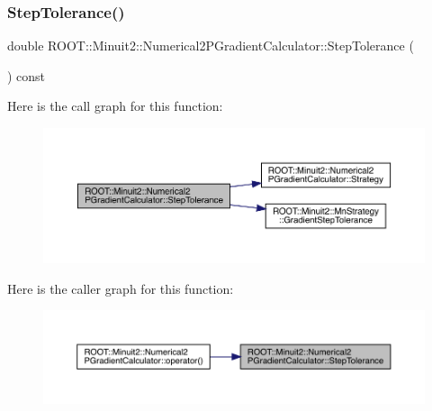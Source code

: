 \subsubsection{\texorpdfstring{StepTolerance()}{StepTolerance()}\hspace{0.1cm}{\footnotesize\ttfamily [1/2]}}
{\footnotesize\ttfamily double R\+O\+O\+T\+::\+Minuit2\+::\+Numerical2\+P\+Gradient\+Calculator\+::\+Step\+Tolerance (\begin{DoxyParamCaption}{ }\end{DoxyParamCaption}) const}

Here is the call graph for this function\+:\nopagebreak
\begin{figure}[H]
\begin{center}
\leavevmode
\includegraphics[width=350pt]{d0/d82/classROOT_1_1Minuit2_1_1Numerical2PGradientCalculator_afb1bbda7e079db02b02b790e0b0f6cca_cgraph}
\end{center}
\end{figure}
Here is the caller graph for this function\+:\nopagebreak
\begin{figure}[H]
\begin{center}
\leavevmode
\includegraphics[width=350pt]{d0/d82/classROOT_1_1Minuit2_1_1Numerical2PGradientCalculator_afb1bbda7e079db02b02b790e0b0f6cca_icgraph}
\end{center}
\end{figure}
\mbox{\label{classROOT_1_1Minuit2_1_1Numerical2PGradientCalculator_afb1bbda7e079db02b02b790e0b0f6cca}} 
